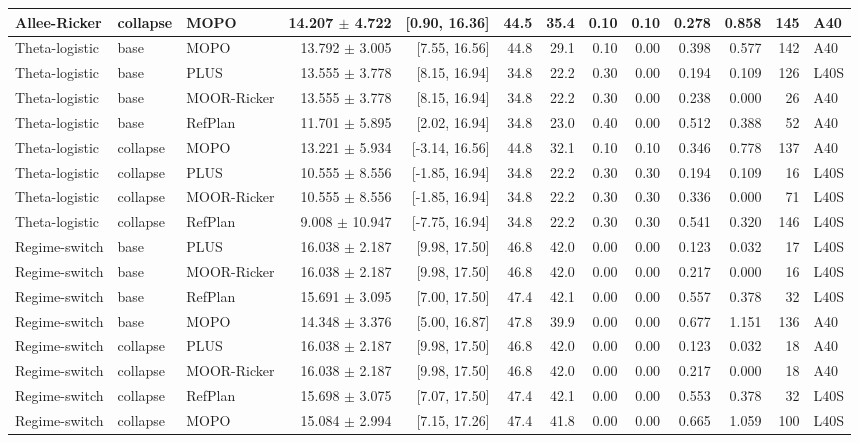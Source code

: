 \documentclass[11pt]{article}
\begin{document}
\begin{landscape}
\begin{scriptsize}
\begin{longtable}{lllrrrrrrrrrl}
Allee-Ricker & collapse & MOPO & 14.207 $\pm$ 4.722 & [0.90, 16.36] & 44.5 & 35.4 & 0.10 & 0.10 & 0.278 & 0.858 & 145 & A40 \\
\midrule
Theta-logistic & base & MOPO & 13.792 $\pm$ 3.005 & [7.55, 16.56] & 44.8 & 29.1 & 0.10 & 0.00 & 0.398 & 0.577 & 142 & A40 \\
Theta-logistic & base & PLUS & 13.555 $\pm$ 3.778 & [8.15, 16.94] & 34.8 & 22.2 & 0.30 & 0.00 & 0.194 & 0.109 & 126 & L40S \\
Theta-logistic & base & MOOR-Ricker & 13.555 $\pm$ 3.778 & [8.15, 16.94] & 34.8 & 22.2 & 0.30 & 0.00 & 0.238 & 0.000 & 26 & A40 \\
Theta-logistic & base & RefPlan & 11.701 $\pm$ 5.895 & [2.02, 16.94] & 34.8 & 23.0 & 0.40 & 0.00 & 0.512 & 0.388 & 52 & A40 \\
\midrule
Theta-logistic & collapse & MOPO & 13.221 $\pm$ 5.934 & [-3.14, 16.56] & 44.8 & 32.1 & 0.10 & 0.10 & 0.346 & 0.778 & 137 & A40 \\
Theta-logistic & collapse & PLUS & 10.555 $\pm$ 8.556 & [-1.85, 16.94] & 34.8 & 22.2 & 0.30 & 0.30 & 0.194 & 0.109 & 16 & L40S \\
Theta-logistic & collapse & MOOR-Ricker & 10.555 $\pm$ 8.556 & [-1.85, 16.94] & 34.8 & 22.2 & 0.30 & 0.30 & 0.336 & 0.000 & 71 & L40S \\
Theta-logistic & collapse & RefPlan & 9.008 $\pm$ 10.947 & [-7.75, 16.94] & 34.8 & 22.2 & 0.30 & 0.30 & 0.541 & 0.320 & 146 & L40S \\
\midrule
Regime-switch & base & PLUS & 16.038 $\pm$ 2.187 & [9.98, 17.50] & 46.8 & 42.0 & 0.00 & 0.00 & 0.123 & 0.032 & 17 & L40S \\
Regime-switch & base & MOOR-Ricker & 16.038 $\pm$ 2.187 & [9.98, 17.50] & 46.8 & 42.0 & 0.00 & 0.00 & 0.217 & 0.000 & 16 & L40S \\
Regime-switch & base & RefPlan & 15.691 $\pm$ 3.095 & [7.00, 17.50] & 47.4 & 42.1 & 0.00 & 0.00 & 0.557 & 0.378 & 32 & L40S \\
Regime-switch & base & MOPO & 14.348 $\pm$ 3.376 & [5.00, 16.87] & 47.8 & 39.9 & 0.00 & 0.00 & 0.677 & 1.151 & 136 & A40 \\
\midrule
Regime-switch & collapse & PLUS & 16.038 $\pm$ 2.187 & [9.98, 17.50] & 46.8 & 42.0 & 0.00 & 0.00 & 0.123 & 0.032 & 18 & A40 \\
Regime-switch & collapse & MOOR-Ricker & 16.038 $\pm$ 2.187 & [9.98, 17.50] & 46.8 & 42.0 & 0.00 & 0.00 & 0.217 & 0.000 & 18 & A40 \\
Regime-switch & collapse & RefPlan & 15.698 $\pm$ 3.075 & [7.07, 17.50] & 47.4 & 42.1 & 0.00 & 0.00 & 0.553 & 0.378 & 32 & L40S \\
Regime-switch & collapse & MOPO & 15.084 $\pm$ 2.994 & [7.15, 17.26] & 47.4 & 41.8 & 0.00 & 0.00 & 0.665 & 1.059 & 100 & L40S \\
\bottomrule
\end{longtable}
\end{scriptsize}
\end{landscape}
\end{document}
